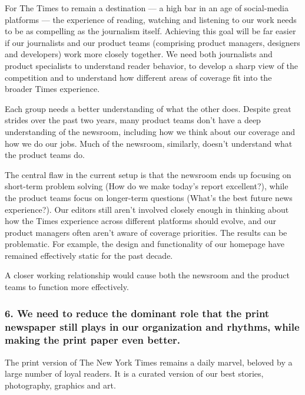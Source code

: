 For The Times to remain a destination --- a high bar in an age of
social-media platforms --- the experience of reading, watching and
listening to our work needs to be as compelling as the journalism
itself. Achieving this goal will be far easier if our journalists and
our product teams (comprising product managers, designers and
developers) work more closely together. We need both journalists and
product specialists to understand reader behavior, to develop a sharp
view of the competition and to understand how different areas of
coverage fit into the broader Times experience.

Each group needs a better understanding of what the other does. Despite
great strides over the past two years, many product teams don't have a
deep understanding of the newsroom, including how we think about our
coverage and how we do our jobs. Much of the newsroom, similarly,
doesn't understand what the product teams do.

The central flaw in the current setup is that the newsroom ends up
focusing on short-term problem solving (How do we make today's report
excellent?), while the product teams focus on longer-term questions
(What's the best future news experience?). Our editors still aren't
involved closely enough in thinking about how the Times experience
across different platforms should evolve, and our product managers often
aren't aware of coverage priorities. The results can be problematic. For
example, the design and functionality of our homepage have remained
effectively static for the past decade.

A closer working relationship would cause both the newsroom and the
product teams to function more effectively.

\hypertarget{6-we-need-to-reduce-the-dominant-role-that-the-print-newspaper-still-plays-in-our-organization-and-rhythms-while-making-the-print-paper-even-better}{%
\subsubsection{6. We need to reduce the dominant role that the print
newspaper still plays in our organization and rhythms, while making the
print paper even
better.}\label{6-we-need-to-reduce-the-dominant-role-that-the-print-newspaper-still-plays-in-our-organization-and-rhythms-while-making-the-print-paper-even-better}}

The print version of The New York Times remains a daily marvel, beloved
by a large number of loyal readers. It is a curated version of our best
stories, photography, graphics and art.

